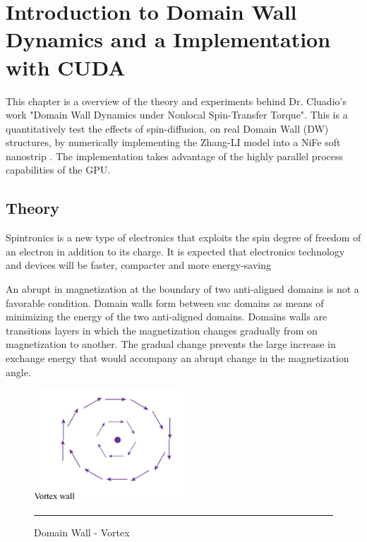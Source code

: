 
\chapter{Introduction to Domain Wall Dynamics and a Implementation with CUDA} %

\label{Introduction to DW Dynamics} %


This chapter is a overview of the theory and experiments behind Dr. Cluadio's work "Domain Wall Dynamics under Nonlocal Spin-Transfer Torque". This is a quantitatively test the effects of spin-diffusion, on real Domain Wall (DW) structures, by numerically implementing the Zhang-LI model into a NiFe soft nanostrip \cite{claudio}. The implementation takes advantage of the highly parallel process capabilities of the GPU.


\section{Theory}

Spintronics is a new type of electronics that exploits the spin degree of freedom of an electron in addition to its charge. It is expected that electronics technology and devices will be faster, compacter and more energy-saving \cite{spinz}

\cite{ferro}

An abrupt in magnetization at the boundary of two anti-aligned domains is not a favorable condition. Domain walls form between suc domains as means of minimizing the energy of the two anti-aligned domains. Domains walls are transitions layers in which the magnetization changes gradually from on magnetization to another.  The gradual change prevents the large increase in exchange energy that would accompany an abrupt change in the magnetization angle. \cite{spindomain}

\begin{figure}[htbp]
	\centering
		\includegraphics[width=0.5\textwidth]{Figures/vortex.png}
		\rule{35em}{0.5pt}
	\caption[Domain Wall - Vortex]{Domain Wall - Vortex}
	\label{fig:vortex}
\end{figure}

